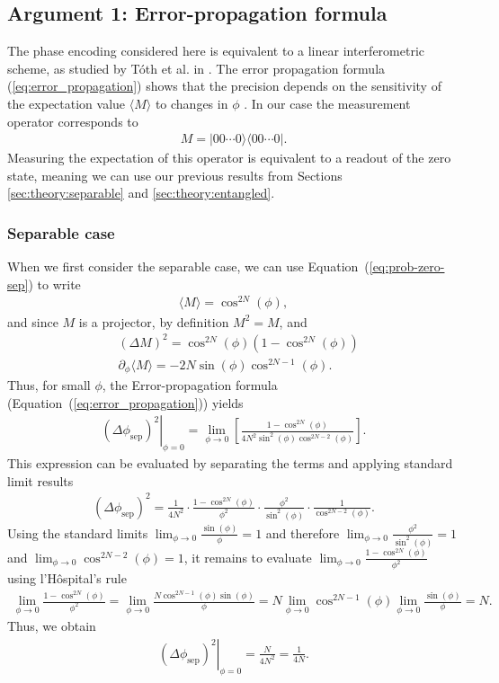\subsection{Argument 1: Error-propagation formula}
\label{sec:arg1}
The phase encoding considered here is equivalent to a linear interferometric scheme, 
as studied by Tóth et al. in \cite{tothQuantumMetrologyQuantum2014}. 
The error propagation formula (\ref{eq:error_propagation}) shows that the precision depends on the sensitivity
of the expectation value $\langle M \rangle$ to changes in $\phi$ \cite{tothQuantumMetrologyQuantum2014}.
In our case the measurement operator corresponds to
\begin{align}
    M = |00\cdots 0\rangle \langle 00\cdots 0|.
\end{align}
Measuring the expectation of this operator is equivalent to a readout of the zero state, meaning we can use our previous 
results from Sections \ref{sec:theory:separable} and \ref{sec:theory:entangled}.
\subsubsection{Separable case}
When we first consider the separable case, we can use Equation~(\ref{eq:prob-zero-sep}) to write
\begin{align}
\langle M \rangle = \cos^{2N}(\phi),
\end{align}
and since $M$ is a projector, by definition $M^2=M$, and
\begin{align}
    &(\Delta M)^2 = \cos^{2N}(\phi)(1-\cos^{2N}(\phi))\\
    &\partial_\phi \langle M\rangle = -2N\sin(\phi)\cos^{2N-1}(\phi).
\end{align}
Thus, for small $\phi$, the Error-propagation formula (Equation~(\ref{eq:error_propagation})) yields
\begin{align}
    \left.(\Delta \phi_\text{sep})^2\right|_{\phi=0} = \lim_{\phi\to 0}\left[\frac{1-\cos^{2N}(\phi)}{4N^2 \sin^2(\phi) \cos^{2N-2}(\phi)}\right].
\end{align}
This expression can be evaluated by separating the terms and applying standard limit results
\begin{align}
    (\Delta \phi_\text{sep})^2 = \frac{1}{4N^2}\cdot \frac{1-\cos^{2N}(\phi)}{\phi^2}\cdot \frac{\phi^2}{\sin^2(\phi)}\cdot \frac{1}{\cos^{2N-2}(\phi)}.
\end{align}
Using the standard limits $\lim_{\phi\to 0} \frac{\sin(\phi)}{\phi}=1$ and therefore $\lim_{\phi\to 0} \frac{\phi^2}{\sin^2(\phi)}=1$ and $\lim_{\phi\to 0}\cos^{2N-2}(\phi) = 1$, it remains to evaluate
$\lim_{\phi\to 0} \frac{1-\cos^{2N}(\phi)}{\phi^2}$ using l'Hôspital's rule
\begin{align}
    \lim_{\phi\to 0} \frac{1-\cos^{2N}(\phi)}{\phi^2} = \lim_{\phi\to 0} \frac{N\cos^{2N-1}(\phi)\sin(\phi)}{\phi} = N \lim_{\phi\to 0} \cos^{2N-1}(\phi) \lim_{\phi\to 0}\frac{\sin(\phi)}{\phi} = N.
\end{align}
Thus, we obtain
\begin{align}
    \left. (\Delta\phi_\text{sep})^2\right|_{\phi=0} = \frac{N}{4N^2}=\frac{1}{4N}.
\end{align}


